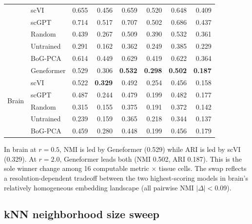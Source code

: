 \documentclass[10pt,letterpaper]{article}
\begin{document}
\begin{table}[h!]
\begin{tabular}{@{}ll rr rr rr@{}}
 & scVI       & 0.655 & 0.456 & 0.659 & 0.520 & 0.648 & 0.409 \\
 & scGPT      & 0.714 & 0.517 & 0.707 & 0.502 & 0.686 & 0.437 \\
 & Random     & 0.439 & 0.267 & 0.509 & 0.390 & 0.532 & 0.361 \\
 & Untrained  & 0.291 & 0.162 & 0.362 & 0.249 & 0.385 & 0.229 \\
 & BoG-PCA    & 0.614 & 0.449 & 0.629 & 0.419 & 0.622 & 0.364 \\
\midrule
\multirow{6}{*}{Brain}
 & Geneformer & 0.529 & 0.306 & \textbf{0.532} & \textbf{0.298} & \textbf{0.502} & \textbf{0.187} \\
 & scVI       & 0.522 & \textbf{0.329} & 0.492 & 0.254 & 0.456 & 0.158 \\
 & scGPT      & 0.487 & 0.244 & 0.479 & 0.199 & 0.482 & 0.177 \\
 & Random     & 0.315 & 0.155 & 0.375 & 0.191 & 0.372 & 0.142 \\
 & Untrained  & 0.239 & 0.159 & 0.365 & 0.218 & 0.344 & 0.137 \\
 & BoG-PCA    & 0.459 & 0.280 & 0.448 & 0.199 & 0.456 & 0.179 \\
\bottomrule
\end{tabular}
\end{table}

In brain at $r = 0.5$, NMI is led by Geneformer (0.529) while ARI is led by scVI (0.329). At $r = 2.0$, Geneformer leads both (NMI 0.502, ARI 0.187). This is the sole winner change among 16 computable metric $\times$ tissue cells. The swap reflects a resolution-dependent tradeoff between the two highest-scoring models in brain's relatively homogeneous embedding landscape (all pairwise NMI $|\Delta| < 0.09$).

\subsection{kNN neighborhood size sweep}
\end{document}
